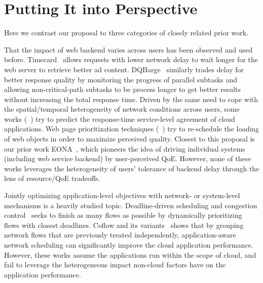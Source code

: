 \section{Putting It into Perspective}
Here we contrast our proposal to three categories of closely related prior work.

That the impact of web backend varies across users has been observed and used before. 
Timecard~\cite{timecard} allows requests with lower network delay to wait longer for the web server to retrieve better ad content. 
DQBarge~\cite{dqbarge} similarly trades delay for better response quality by monitoring the progress of parallel subtasks and allowing non-critical-path subtasks to be process longer to get better results without increasing the total response time.
Driven by the same need to cope with the spatial/temporal heterogeneity of network conditions across users, some works (\eg~\cite{jayathilaka2015response}) try to predict the response-time service-level agreement of cloud applications.
Web page prioritization techniques (\eg~\cite{butkiewicz2015klotski,netravali2016polaris}) try to re-schedule the loading of web objects in order to maximize perceived quality.
Closest to this proposal is our prior work EONA~\cite{eona}, which pioneers the idea of driving individual systems (including web service backend) by user-perceived QoE.
However, none of these works leverages the heterogeneity of users' tolerance of backend delay through the lens of resource/QoE tradeoffs. 

Jointly optimizing application-level objectives with network- or system-level mechanisms is a heavily studied topic. 
Deadline-driven scheduling and congestion control~\cite{vamanan2012deadline,wilson2011better} seeks to finish as many flows as possible by dynamically prioritizing flows with closest deadlines.
Coflow and its variants~\cite{coflow,chowdhury2015efficient} shows that by grouping network flows that are previously treated independently, application-aware network scheduling can significantly improve the cloud application performance.
However, these works assume the applications run within the scope of cloud, and fail to leverage the heterogeneous impact non-cloud factors have on the application performance.

